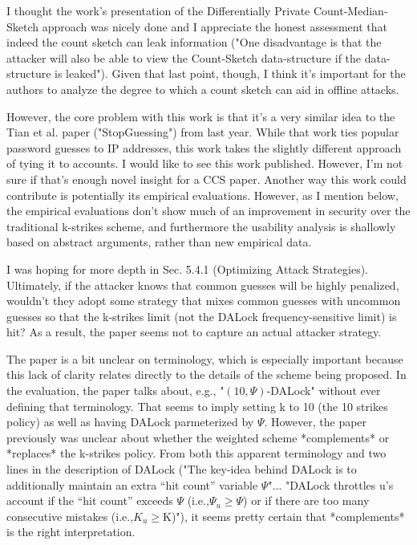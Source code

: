 I thought the work's presentation of the Differentially Private Count-Median-Sketch approach was nicely done and I appreciate the honest assessment that indeed the count sketch can leak information ("One disadvantage is that the attacker will also be able to view the Count-Sketch data-structure if the data-structure is leaked"). Given that last point, though, I think it's important for the authors to analyze the degree to which a count sketch can aid in offline attacks.

However, the core problem with this work is that it's a very similar idea to the Tian et al. paper ("StopGuessing") from last year. While that work ties popular password guesses to IP addresses, this work takes the slightly different approach of tying it to accounts. I would like to see this work published. However, I'm not sure if that's enough novel insight for a CCS paper. Another way this work could contribute is potentially its empirical evaluations. However, as I mention below, the empirical evaluations don't show much of an improvement in security over the traditional k-strikes scheme, and furthermore the usability analysis is shallowly based on abstract arguments, rather than new empirical data.

I was hoping for more depth in Sec. 5.4.1 (Optimizing Attack Strategies). Ultimately, if the attacker knows that common guesses will be highly penalized, wouldn't they adopt some strategy that mixes common guesses with uncommon guesses so that the k-strikes limit (not the DALock frequency-sensitive limit) is hit? As a result, the paper seems not to capture an actual attacker strategy.

The paper is a bit unclear on terminology, which is especially important because this lack of clarity relates directly to the details of the scheme being proposed. In the evaluation, the paper talks about, e.g., "$(10,\Psi)$-DALock" without ever defining that terminology. That seems to imply setting k to 10 (the 10 strikes policy) as well as having DALock parmeterized by $\Psi$. However, the paper previously was unclear about whether the weighted scheme *complements* or *replaces* the k-strikes policy. From both this apparent terminology and two lines in the description of DALock ("The key-idea behind DALock is to additionally maintain an extra “hit count” variable $\Psi$"... "DALock throttles u’s account if the “hit count” exceeds $\Psi$ (i.e.,$\Psi_u \ge \Psi$) or if there are too many consecutive mistakes (i.e.,$K_u$$\ge$K)"), it seems pretty certain that *complements* is the right interpretation.


